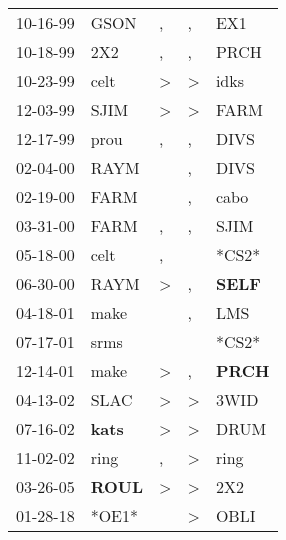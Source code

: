 \begin{supertabular}{p{0.07\textwidth}p{0.06\textwidth}p{0.02\textwidth}p{0.02\textwidth}p{0.06\textwidth}}
 10-16-99\textsuperscript{} &           GSON\textsuperscript{} &             , &             , &            EX1\textsuperscript{} \\
 10-18-99\textsuperscript{} &            2X2\textsuperscript{} &             , &             , &           PRCH\textsuperscript{} \\
 10-23-99\textsuperscript{} &           celt\textsuperscript{} &  \textgreater &  \textgreater &           idks\textsuperscript{} \\
 12-03-99\textsuperscript{} &           SJIM\textsuperscript{} &  \textgreater &  \textgreater &           FARM\textsuperscript{} \\
 12-17-99\textsuperscript{} &           prou\textsuperscript{} &             , &             , &           DIVS\textsuperscript{} \\
 02-04-00\textsuperscript{} &           RAYM\textsuperscript{} &               &             , &           DIVS\textsuperscript{} \\
 02-19-00\textsuperscript{} &           FARM\textsuperscript{} &               &             , &           cabo\textsuperscript{} \\
 03-31-00\textsuperscript{} &           FARM\textsuperscript{} &             , &             , &           SJIM\textsuperscript{} \\
 05-18-00\textsuperscript{} &           celt\textsuperscript{} &             , &               &                            *CS2* \\
 06-30-00\textsuperscript{} &           RAYM\textsuperscript{} &  \textgreater &             , &  \textbf{SELF\textsuperscript{}} \\
 04-18-01\textsuperscript{} &           make\textsuperscript{} &               &             , &            LMS\textsuperscript{} \\
 07-17-01\textsuperscript{} &           srms\textsuperscript{} &               &               &                            *CS2* \\
 12-14-01\textsuperscript{} &           make\textsuperscript{} &  \textgreater &             , &  \textbf{PRCH\textsuperscript{}} \\
 04-13-02\textsuperscript{} &           SLAC\textsuperscript{} &  \textgreater &  \textgreater &           3WID\textsuperscript{} \\
 07-16-02\textsuperscript{} &  \textbf{kats\textsuperscript{}} &  \textgreater &  \textgreater &           DRUM\textsuperscript{} \\
 11-02-02\textsuperscript{} &           ring\textsuperscript{} &             , &  \textgreater &           ring\textsuperscript{} \\
 03-26-05\textsuperscript{} &  \textbf{ROUL\textsuperscript{}} &  \textgreater &  \textgreater &            2X2\textsuperscript{} \\
 01-28-18\textsuperscript{} &                            *OE1* &               &  \textgreater &           OBLI\textsuperscript{} \\
\end{supertabular}
